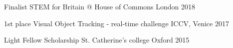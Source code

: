 \begin{cvhonors}

  \cvhonor
    {Finalist} %
    {STEM for Britain @ House of Commons} %
    {London} %
    {2018} %

  \cvhonor
    {1st place} %
    {Visual Object Tracking - real-time challenge} %
    {ICCV, Venice} %
    {2017} %

  \cvhonor
    {Light Fellow Scholarship} %
    {St. Catherine's college} %
    {Oxford} %
    {2015} %
\end{cvhonors}
